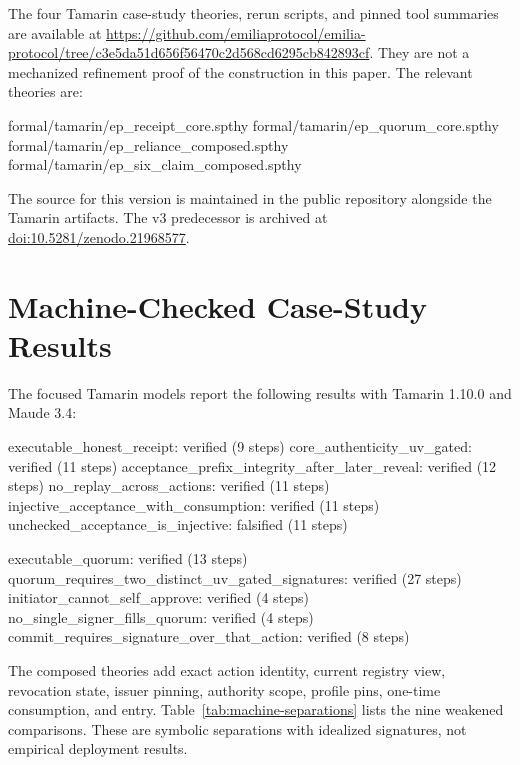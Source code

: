 \documentclass[10pt]{article}
\begin{document}
The four Tamarin case-study theories, rerun scripts, and pinned tool summaries
are available at
\url{https://github.com/emiliaprotocol/emilia-protocol/tree/c3e5da51d656f56470c2d568cd6295cb842893cf}. They
are not a mechanized refinement proof of the construction in this paper. The
relevant theories are:

\begin{protocol}
formal/tamarin/ep_receipt_core.spthy
formal/tamarin/ep_quorum_core.spthy
formal/tamarin/ep_reliance_composed.spthy
formal/tamarin/ep_six_claim_composed.spthy
\end{protocol}

The source for this version is maintained in the public repository alongside
the Tamarin artifacts. The v3 predecessor is archived at
\href{https://doi.org/10.5281/zenodo.21968577}{doi:10.5281/zenodo.21968577}.

\appendix
\section{Machine-Checked Case-Study Results}
\label{app:tamarin}

The focused Tamarin models report the following results with Tamarin 1.10.0 and
Maude 3.4:

\begin{protocol}
executable_honest_receipt: verified (9 steps)
core_authenticity_uv_gated: verified (11 steps)
acceptance_prefix_integrity_after_later_reveal: verified (12 steps)
no_replay_across_actions: verified (11 steps)
injective_acceptance_with_consumption: verified (11 steps)
unchecked_acceptance_is_injective: falsified (11 steps)

executable_quorum: verified (13 steps)
quorum_requires_two_distinct_uv_gated_signatures: verified (27 steps)
initiator_cannot_self_approve: verified (4 steps)
no_single_signer_fills_quorum: verified (4 steps)
commit_requires_signature_over_that_action: verified (8 steps)
\end{protocol}

The composed theories add exact action identity, current registry view,
revocation state, issuer pinning, authority scope, profile pins, one-time
consumption, and entry. Table~\ref{tab:machine-separations} lists the nine
weakened comparisons. These are symbolic separations with idealized signatures,
not empirical deployment results.
\end{document}

